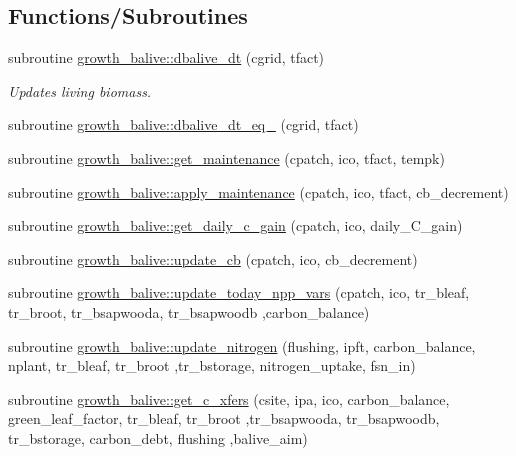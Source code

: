 \subsection*{Functions/\+Subroutines}
\begin{DoxyCompactItemize}
\item 
subroutine \hyperlink{namespacegrowth__balive_a7781ae229b2399c90d50858382665ee8}{growth\+\_\+balive\+::dbalive\+\_\+dt} (cgrid, tfact)
\begin{DoxyCompactList}\small\item\em Updates living biomass. \end{DoxyCompactList}\item 
subroutine \hyperlink{namespacegrowth__balive_a15cba39e9b70b8dd6a1e2d0cbdd5cc2e}{growth\+\_\+balive\+::dbalive\+\_\+dt\+\_\+eq\+\_} (cgrid, tfact)
\item 
subroutine \hyperlink{namespacegrowth__balive_ac2f667372e6f2a5fc7329466cc958a6c}{growth\+\_\+balive\+::get\+\_\+maintenance} (cpatch, ico, tfact, tempk)
\item 
subroutine \hyperlink{namespacegrowth__balive_a692030d19fe1844dd9d9b676a9475e64}{growth\+\_\+balive\+::apply\+\_\+maintenance} (cpatch, ico, tfact, cb\+\_\+decrement)
\item 
subroutine \hyperlink{namespacegrowth__balive_ad43c7e3fcb88db17077ed58aeab8fe2d}{growth\+\_\+balive\+::get\+\_\+daily\+\_\+c\+\_\+gain} (cpatch, ico, daily\+\_\+\+C\+\_\+gain)
\item 
subroutine \hyperlink{namespacegrowth__balive_ac4ca7901eed6321044f171f6f1b8d7d6}{growth\+\_\+balive\+::update\+\_\+cb} (cpatch, ico, cb\+\_\+decrement)
\item 
subroutine \hyperlink{namespacegrowth__balive_a2bc138f187a465304da86a27fb804f45}{growth\+\_\+balive\+::update\+\_\+today\+\_\+npp\+\_\+vars} (cpatch, ico, tr\+\_\+bleaf, tr\+\_\+broot, tr\+\_\+bsapwooda, tr\+\_\+bsapwoodb                                                                                                                                       ,carbon\+\_\+balance)
\item 
subroutine \hyperlink{namespacegrowth__balive_a555ad92da5ad088f7161ea46d6ec8152}{growth\+\_\+balive\+::update\+\_\+nitrogen} (flushing, ipft, carbon\+\_\+balance, nplant, tr\+\_\+bleaf, tr\+\_\+broot                                                                                                                                               ,tr\+\_\+bstorage, nitrogen\+\_\+uptake, fsn\+\_\+in)
\item 
subroutine \hyperlink{namespacegrowth__balive_a2308a9254122e6c26aaf642a88815ca3}{growth\+\_\+balive\+::get\+\_\+c\+\_\+xfers} (csite, ipa, ico, carbon\+\_\+balance, green\+\_\+leaf\+\_\+factor, tr\+\_\+bleaf, tr\+\_\+broot                                                                                               ,tr\+\_\+bsapwooda, tr\+\_\+bsapwoodb, tr\+\_\+bstorage, carbon\+\_\+debt, flushing                                                                                                                       ,balive\+\_\+aim)

\end{DoxyCompactItemize}

